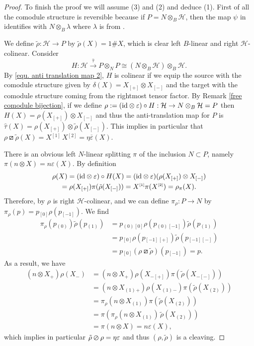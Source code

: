 \documentclass[a4paper,reqno]{amsart}
\newcommand*{\id}{\textup{id}}
\numberwithin{equation}{section}
\theoremstyle{plain}
\theoremstyle{remark}
\numberwithin{equation}{section}
\newcommand{\ot}{\otimes}
\newcommand\ol{\overline}
\newcommand{\yi}[1]{{#1}{}{}^{\scriptscriptstyle{[1]}}}
\newcommand{\er}[1]{{#1}{}{}^{\scriptscriptstyle{[2]}}}
\newcommand{\trho}{{\tilde{\rho}}}
\newcommand{\z}{{}_{\scriptscriptstyle{(0)}}}
\newcommand{\rz}{{}_{\scriptscriptstyle{[0]}}}
\renewcommand{\o}{{}_{\scriptscriptstyle{(1)}}}
\newcommand{\rmo}{{}_{\scriptscriptstyle{[-1]}}}
\renewcommand{\t}{{}_{\scriptscriptstyle{(2)}}}
\newcommand\ou[1]{\otimes_{#1}}
\newcommand{\CH}{\mathcal{H}}
\newcommand\skpr{\varoslash}
\newcommand\askpr{\boxslash}
\begin{document}
\begin{proof}
    
    
    To finish the proof we will assume (3) and (2) and deduce (1). First of all the comodule structure is  reversible because if $P=N\ou B\CH$, then the map $\psi$ in  identifies with $N\ou B\lambda$ where $\lambda$ is from . 
    
    We define $\tilde\rho\colon \CH\to P$ by $\tilde\rho(X)=1\#X$, which is clear left $B$-linear and right $\CH$-colinear. Consider
    \[H:\CH\xrightarrow{\hat\tau}P\ou NP\cong (N\ou B\CH)\ou B\CH.\]
    By \eqref{equ. anti translation map 2}, $H$ is colinear if we equip the source with the comodule structure given by $\delta(X)=X_{[+]}\ot X_{[-]}$ and the target with the comodule structure coming from the rightmost tensor factor. By Remark \ref{free comodule bijection}, if we define $\rho:=(\id\ot \varepsilon)\circ H:\CH\to N\ot_{B}\CH=P$ then $H(X)=\rho(X_{[+]})\ot X_{[-]}$  and thus the anti-translation map for $P$ is $\hat\tau(X)=\rho(X_{[+]})\ot\tilde\rho(X_{[-]})$. This implies in particular that $\rho\askpr\tilde \rho(X)=X\yi{} \,X\er{}=\eta\ol\varepsilon(X)$.



There is an obvious left $N$-linear splitting $\pi$ of the inclusion $N\subset P$, namely $\pi(n\ot X)=n\varepsilon(X)$. By definition 
\begin{multline*} 
\rho(X)=(\id\ot \varepsilon)\circ H(X)=(\id\ot \varepsilon)(\rho(X_{[+]})\ot X_{[-]})\\=\rho(X_{[+]})\pi(\tilde\rho(X_{[-]}))=X\yi{}\pi(X\er{})=\rho_{\pi}(X).\end{multline*} Therefore, by   $\rho$ is right $\CH$-colinear, and we can define $\pi_{\rho}:P\to N$ by $\pi_{\rho}(p)= p\rz\rho(p\rmo)$. We find
    \begin{align*} 
      \pi_\rho(p\z)\trho(p\o)
      &=p\z\rz\rho(p\z\rmo)\trho(p\o)\\
      &=p\rz\rho(p\rmo{}_{[+]})\trho(p\rmo{}_{[-]})\\
      &=p\rz(\rho\askpr\trho)(p\rmo)=p.
    \end{align*} 
    As a result, we have
    \begin{align*}
        (n\ot X_+)\rho(X_-)
        &=(n\ot X_+)\rho(X_{-[+]})\pi(\trho(X_{-[-]}))\\
        &=(n\ot X\o{}_{+})\rho(X\o{}_{-})\pi(\trho(X\t))\\
        &=\pi_\rho(n\ot X\o)\pi(\trho(X\t))\\
        &=\pi(\pi_\rho(n\ot X\o)\,\trho(X\t))\\
        &=\pi(n\ot X)=n\varepsilon(X),
    \end{align*}
    which implies in particular $\trho\skpr\rho=\eta\varepsilon$ and thus $(\rho,\trho)$ is a cleaving.
\end{proof}
\end{document}
